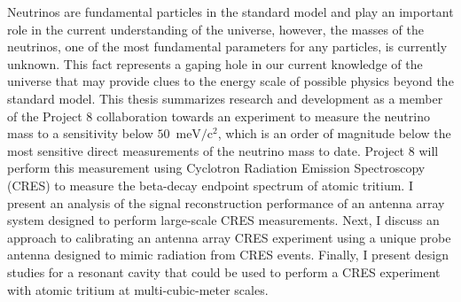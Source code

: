 
\vspace{-0.3in}

Neutrinos are fundamental particles in the standard model and play an important role in the current understanding of the universe, however, the masses of the neutrinos, one of the most fundamental parameters for any particles, is currently unknown. This fact represents a gaping hole in our current knowledge of the universe that may provide clues to the energy scale of possible physics beyond the standard model. This thesis summarizes research and development as a member of the Project 8 collaboration towards an experiment to measure the neutrino mass to a sensitivity below $50$~$\mathrm{meV}/\mathrm{c}^2$, which is an order of magnitude below the most sensitive direct measurements of the neutrino mass to date. Project 8 will perform this measurement using Cyclotron Radiation Emission Spectroscopy (CRES) to measure the beta-decay endpoint spectrum of atomic tritium. I present an analysis of the signal reconstruction performance of an antenna array system designed to perform large-scale CRES measurements. Next, I discuss an approach to calibrating an antenna array CRES experiment using a unique probe antenna designed to mimic radiation from CRES events. Finally, I present design studies for a resonant cavity that could be used to perform a CRES experiment with atomic tritium at multi-cubic-meter scales.